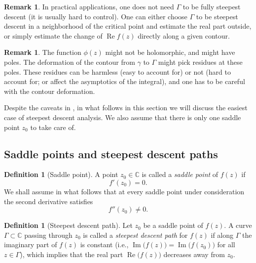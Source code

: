 \documentclass[letterpaper,11pt,oneside,reqno]{book}
\numberwithin{equation}{chapter}  %
\theoremstyle{definition}
\newtheorem{definition}[proposition]{Definition}
\newtheorem{remark}[proposition]{Remark}
\begin{document}
\begin{remark}
	\label{lecture6:rem:steepest-descent}
	In practical applications, one does not
	need $\Gamma$ to be fully steepest descent (it is usually hard to control).
	One can either choose $\Gamma$ to be steepest descent
	in a neighborhood of the critical point and estimate the real part outside,
	or simply estimate the change of $\operatorname{Re}f(z)$ directly along a given contour.
\end{remark}

\begin{remark}
	\label{lecture6:rem:residues}
	The function $\phi(z)$ might not be holomorphic, and might have poles. The
	deformation of the contour from $\gamma$ to $\Gamma$ might pick residues
	at these poles. These residues can be harmless (easy to account for) or
	not (hard to account for; or affect the asymptotics of the integral),
	and one has to be careful with the contour deformation.
\end{remark}

Despite the caveats in ,
in what follows in this section we will discuss the
easiest case of steepest descent analysis.
We also assume that there is only one saddle point $z_0$
to take care of.

\subsection{Saddle points and steepest descent paths}

\begin{definition}[Saddle point]
	A point $z_0\in\mathbb{C}$ is called a \emph{saddle point} of $f(z)$ if
	\[
		f'(z_0)=0.
	\]
	We shall assume in what follows that at every saddle point under consideration the second derivative satisfies
	\[
		f''(z_0)\neq 0.
	\]
\end{definition}

\begin{definition}[Steepest descent path]
	Let $z_0$ be a saddle point of $f(z)$. A curve $\Gamma\subset\mathbb{C}$ passing through $z_0$ is called a \emph{steepest descent path} for $f(z)$ if along $\Gamma$ the imaginary part of $f(z)$ is constant (i.e.,
	\(
		\operatorname{Im}\bigl(f(z)\bigr)=\operatorname{Im}\bigl(f(z_0)\bigr)
	\)
	for all $z\in\Gamma$), which implies that the real part
	$\operatorname{Re}\bigl(f(z)\bigr)$ decreases away from
	$z_0$.
\end{definition}
\end{document}
